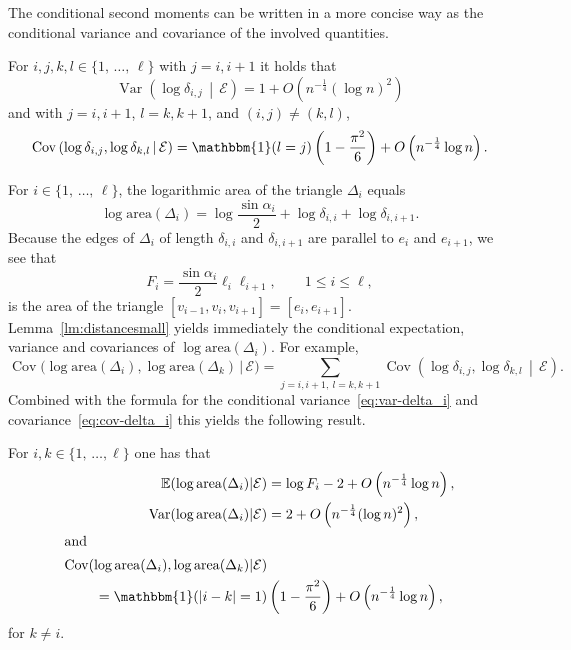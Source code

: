 \documentclass[10pt]{amsart}
\theoremstyle{definition}\newtheorem{defi}[theo]{Definition}\newtheorem{rema}[theo]{Remark}\newtheorem{exam}[theo]{Example}\newtheorem{exem}[theo]{Example}\newtheorem{nota}[theo]{Notation}
\newcommand{\ind}{\mathbbm{1}}
\newcommand{\var}{\operatorname{Var}}
\newcommand{\cov}{\operatorname{Cov}}
\newcommand{\bbE}{\mathbb{E}}
\newcommand{\clE}{\mathcal{E}}
\newcommand{\area}{\mathrm{area}}
\begin{document}
The conditional second moments can be written in a more concise way as the conditional variance and covariance of the involved quantities.
\begin{coro}
For $i,j,k,l\in\{1,\,\ldots,\,\ell\}$ with $j=i,i+1$ it holds that
\begin{equation}\label{eq:var-delta_i}
\var \left(\log \delta_{i,j}\,\middle|\,\clE\right) = 1 + O\left(n^{- \frac 14} (\log n)^2\right)
\end{equation}
and with $j=i,i+1$, $l=k,k+1$, and $(i,j) \neq (k,l)$,
\begin{equation}\label{eq:cov-delta_i}
\cov \left(\log \delta_{i,j}, \log \delta_{k,l}\,\middle|\,\clE\right) =
\ind(l=j)\left(1-\frac{\pi^2}6\right) + O\left(n^{- \frac 14} \log n\right).
\end{equation}
\end{coro}

For $i\in\{1,\,\ldots,\,\ell\}$, the logarithmic area of the triangle $\Delta_i$ equals
\[
\log {\area}(\Delta_i) =
\log \frac{\sin \alpha_i}2 + \log \delta_{i,i} + \log \delta_{i,i+1}.
\]
Because the edges of $\Delta_i$ of length $\delta_{i,i}$ and $\delta_{i,i+1}$ are parallel to $e_i$ and $e_{i+1}$, we see that
\[
F_i= \frac{\sin \alpha_i}2 \ell_i \ell_{i+1},\qquad 1\leq i\leq \ell,
\]
is the area of the triangle $[v_{i-1}, v_i, v_{i+1}]=[e_i, e_{i+1}]$. Lemma~\ref{lm:distancesmall} yields immediately the conditional expectation, variance and covariances of $\log{\area}(\Delta_i)$. For example,
\[
\cov \big(\log {\area}(\Delta_i), \log {\area} (\Delta_k)\,\big|\,\clE\big) =
\sum_{j=i, i+1,\ l=k, k+1} \cov \left(\log \delta_{i,j}, \log \delta_{k,l}\, \middle|\,\clE\right).
\]
Combined with the formula for the conditional variance~\eqref{eq:var-delta_i} and covariance~\eqref{eq:cov-delta_i} this yields the following result.

\begin{coro}\label{cor:moments-logarea}
For $i,k\in\{1,\,\ldots,\ell\}$ one has that
\begin{align}
\bbE (\log {\area} (\Delta_i)|\clE) &= \log F_i -2 + O\left(n^{- \frac 14} \log n\right),\label{eq:E-log-area} \\
\var (\log {\area} (\Delta_i) |\clE) &= 2+ O\left(n^{- \frac 14} (\log n)^2\right),\label{eq:Var-log-area}\\
\intertext{and}
\cov (\log {\area}(\Delta_i), \log {\area} (\Delta_k) |\clE) &\label{eq:Covar-log-area}\\
=\ind(|i-k|=1) &\left(1 - \frac{\pi^2}6 \right) + O\left(n^{- \frac 14} \log n\right),\nonumber
\end{align}
for $k\neq i$.
\end{coro}
\end{document}
